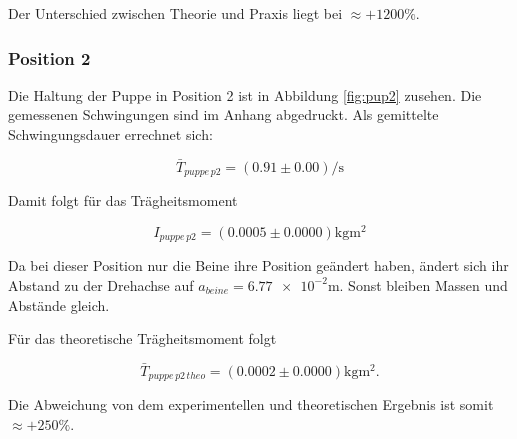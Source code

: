 Der Unterschied zwischen Theorie und Praxis liegt bei $\approx +1200 \%$. %

\subsubsection{Position 2}
Die Haltung der Puppe in Position 2 ist in Abbildung \ref{fig:pup2} zusehen.
Die gemessenen Schwingungen sind im Anhang abgedruckt. %
Als gemittelte Schwingungsdauer errechnet sich:

\begin{equation*}
\bar{T}_{puppe\, p2}=\left(\num{0.91}\pm\num{0.00}\right) \si{\per\second}
\end{equation*}

Damit folgt für das Trägheitsmoment

\begin{equation}
\label{eq:traeg_puppe_p2}
I_{puppe \,p2}= \left(\num{0.0005}\pm\num{0.0000}\right)\si{\kilogram\meter\squared}
\end{equation}

Da bei dieser Position nur die Beine ihre Position geändert haben, ändert
sich ihr Abstand zu der Drehachse auf $a_{beine}=\num{6.77e-2}\si{\meter}$.
Sonst bleiben Massen und Abstände gleich.

Für das theoretische Trägheitsmoment folgt

\begin{equation*}
\bar{T}_{puppe\, p2\,theo}=\left(\num{0.0002}\pm\num{0.0000}\right) \si{\kilogram\meter\squared}.
\end{equation*}

Die Abweichung von dem experimentellen und theoretischen Ergebnis ist
somit $\approx +250 \%$. %
